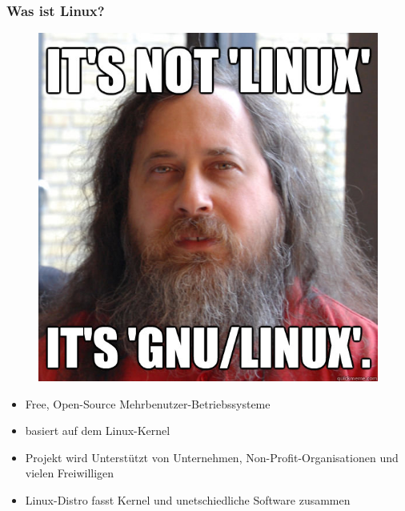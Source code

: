\documentclass{beamer}
\begin{document}
\begin{frame}
\frametitle{Was ist Linux?}
\begin{figure}
\includegraphics[scale=0.17]{resources/linux.jpg}
\end{figure}
\begin{itemize}
	\item Free, Open-Source Mehrbenutzer-Betriebssysteme
	\item basiert auf dem Linux-Kernel
	\item Projekt wird Unterstützt von Unternehmen, Non-Profit-Organisationen und vielen Freiwilligen
	\item Linux-Distro fasst Kernel und unetschiedliche Software zusammen
\end{itemize}
\end{frame}
\end{document}
